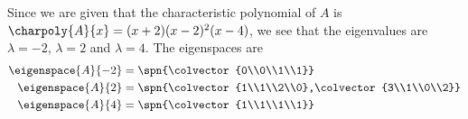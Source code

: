 Since we are given that the characteristic polynomial of $A$ is $\charpoly{A}{x} = (x+2)(x-2)^2(x-4)$, we see that the eigenvalues are 
$\lambda = -2$, $\lambda = 2$ and $\lambda = 4$.  The eigenspaces are 
%
\begin{align*}
\eigenspace{A}{-2}&= \spn{\colvector{0\\0\\1\\1}}\\
\eigenspace{A}{2} &= \spn{\colvector{1\\1\\2\\0},\colvector{3\\1\\0\\2}}\\
\eigenspace{A}{4} &= \spn{\colvector{1\\1\\1\\1}}
\end{align*}
%